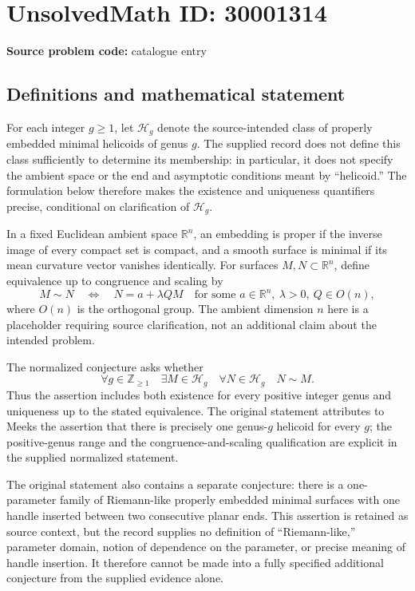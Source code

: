 \documentclass[11pt]{article}
\newcommand{\Z}{\mathbb{Z}}
\newcommand{\R}{\mathbb{R}}
\begin{document}
\section*{UnsolvedMath ID: 30001314}
\textbf{Source problem code:} catalogue entry
\subsection{Definitions and mathematical statement}
For each integer \(g\geq 1\), let \(\mathcal H_g\) denote the source-intended class of properly embedded minimal helicoids of genus \(g\). The supplied record does not define this class sufficiently to determine its membership: in particular, it does not specify the ambient space or the end and asymptotic conditions meant by ``helicoid.'' The formulation below therefore makes the existence and uniqueness quantifiers precise, conditional on clarification of \(\mathcal H_g\).

In a fixed Euclidean ambient space \(\R^n\), an embedding is proper if the inverse image of every compact set is compact, and a smooth surface is minimal if its mean curvature vector vanishes identically. For surfaces \(M,N\subset\R^n\), define equivalence up to congruence and scaling by
\[
M\sim N\quad\Longleftrightarrow\quad
N=a+\lambda QM
\quad\text{for some }a\in\R^n,\ \lambda>0,\ Q\in O(n),
\]
where \(O(n)\) is the orthogonal group. The ambient dimension \(n\) here is a placeholder requiring source clarification, not an additional claim about the intended problem.

The normalized conjecture asks whether
\[
\forall g\in\Z_{\geq1}\quad
\exists M\in\mathcal H_g\quad
\forall N\in\mathcal H_g\quad N\sim M.
\]
Thus the assertion includes both existence for every positive integer genus and uniqueness up to the stated equivalence. The original statement attributes to Meeks the assertion that there is precisely one genus-\(g\) helicoid for every \(g\); the positive-genus range and the congruence-and-scaling qualification are explicit in the supplied normalized statement.

The original statement also contains a separate conjecture: there is a one-parameter family of Riemann-like properly embedded minimal surfaces with one handle inserted between two consecutive planar ends. This assertion is retained as source context, but the record supplies no definition of ``Riemann-like,'' parameter domain, notion of dependence on the parameter, or precise meaning of handle insertion. It therefore cannot be made into a fully specified additional conjecture from the supplied evidence alone.
\end{document}
